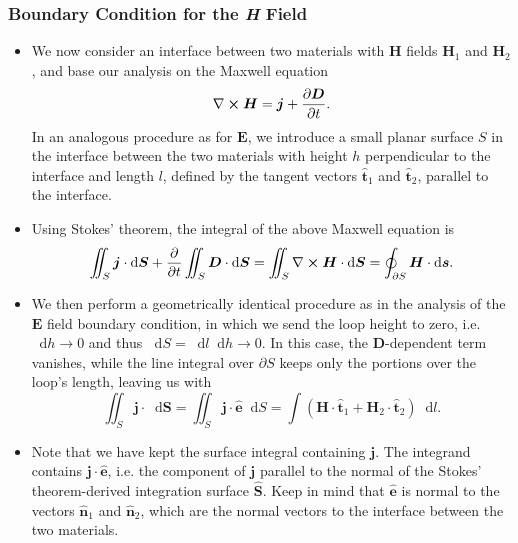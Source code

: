 \documentclass[11pt, a4paper]{article}
\newcommand{\diff}{\mathop{}\!\mathrm{d}} %
\renewcommand{\vec}[1]{\bm{#1}} %
\newcommand{\uvec}[1]{\hat{\vec{#1}}} %
\newcommand{\E}{\vec{E}} %
\newcommand{\D}{\vec{D}}  %
\renewcommand{\H}{\vec{H}}  %
\renewcommand{\j}{\vec{j}}  %
\renewcommand{\curl}{\nabla \cross}
\begin{document}
\subsubsection{Boundary Condition for the \textit{H} Field}
\begin{itemize}
	\item We now consider an interface between two materials with $ \H $ fields $ \H_{1} $ and $ \H_{2} $, and base our analysis on the Maxwell equation
	\begin{equation*}
		\curl \H = \j + \pdv{\D}{t}.
	\end{equation*}
	In an analogous procedure as for $ \E $, we introduce a small planar surface $ S $ in the interface between the two materials with height $ h $ perpendicular to the interface and length $ l $, defined by the tangent vectors $ \uvec{t}_{1} $ and $ \uvec{t}_{2} $, parallel to the interface.
	
	\item Using Stokes' theorem, the integral of the above Maxwell equation is
    \begin{equation*}
        \iint_{S} \j \cdot \diff \vec{S} + \pdv{t} \iint_{S} \D \cdot \diff \vec{S} = \iint_{S} \curl \H \cdot \diff \vec{S} = \oint_{\partial S} \H \cdot \diff \vec{s}.
	\end{equation*}

    \item We then perform a geometrically identical procedure as in the analysis of the $ \E $ field boundary condition, in which we send the loop height to zero, i.e. $ \diff h \to 0 $ and thus $ \diff S = \diff l \diff h \to 0 $. In this case, the $ \D $-dependent term vanishes, while the line integral over $ \partial S $ keeps only the portions over the loop's length, leaving us with
	\begin{equation*}
        \iint_{S} \j \cdot \diff \vec{S} = \iint_{S} \j \cdot \uvec{e} \diff S = \int (\H \cdot \uvec{t}_{1} + \H_{2}\cdot \uvec{t}_{2}) \diff l.
	\end{equation*}
    
    \item Note that we have kept the surface integral containing $ \j $. The integrand contains $ \j \cdot \uvec{e} $, i.e. the component of $ \j $ parallel to the normal of the Stokes' theorem-derived integration surface $ \uvec{S} $. Keep in mind that $ \uvec{e} $ is normal to the vectors $ \uvec{n}_{1} $ and $ \uvec{n}_{2} $, which are the normal vectors to the interface between the two materials.


\end{itemize}
\end{document}
